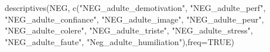 \documentclass[
]{article}
\newenvironment{Shaded}{\begin{snugshade}}{\end{snugshade}}
\newcommand{\AttributeTok}[1]{\textcolor[rgb]{0.77,0.63,0.00}{#1}}
\newcommand{\ConstantTok}[1]{\textcolor[rgb]{0.00,0.00,0.00}{#1}}
\newcommand{\FunctionTok}[1]{\textcolor[rgb]{0.00,0.00,0.00}{#1}}
\newcommand{\NormalTok}[1]{#1}
\newcommand{\OtherTok}[1]{\textcolor[rgb]{0.56,0.35,0.01}{#1}}
\newcommand{\SpecialCharTok}[1]{\textcolor[rgb]{0.00,0.00,0.00}{#1}}
\newcommand{\StringTok}[1]{\textcolor[rgb]{0.31,0.60,0.02}{#1}}
\begin{document}
\begin{Shaded}
\end{Shaded}

\begin{Shaded}
\begin{Highlighting}[]
\FunctionTok{descriptives}\NormalTok{(NEG, }\FunctionTok{c}\NormalTok{(}\StringTok{"NEG\_adulte\_demotivation"}\NormalTok{, }
                    \StringTok{"NEG\_adulte\_perf"}\NormalTok{, }
                    \StringTok{"NEG\_adulte\_confiance"}\NormalTok{, }
                    \StringTok{"NEG\_adulte\_image"}\NormalTok{, }
                    \StringTok{"NEG\_adulte\_peur"}\NormalTok{, }
                    \StringTok{"NEG\_adulte\_colere"}\NormalTok{, }
                    \StringTok{"NEG\_adulte\_triste"}\NormalTok{, }
                    \StringTok{"NEG\_adulte\_stress"}\NormalTok{, }
                    \StringTok{"NEG\_adulte\_faute"}\NormalTok{, }
                    \StringTok{"Neg\_adulte\_humiliation"}\NormalTok{),}\AttributeTok{freq=}\ConstantTok{TRUE}\NormalTok{) }
\end{Highlighting}
\end{Shaded}
\end{document}
